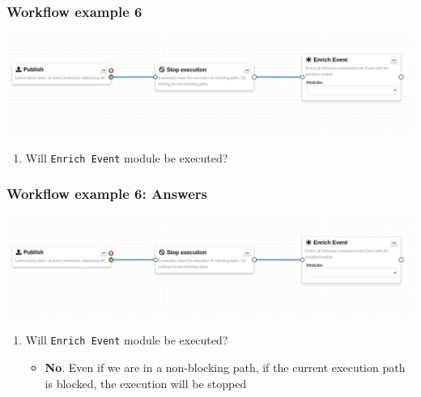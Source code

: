 \begin{frame}
    \frametitle{Workflow example 6}
    \begin{center}
        \includegraphics[width=0.9\linewidth]{pictures/example-6.png}
    \end{center}
    \begin{enumerate}
        \item Will \texttt{Enrich Event} module be executed?
    \end{enumerate}
\end{frame}
\begin{frame}
    \frametitle{Workflow example 6: Answers}
    \begin{center}
        \includegraphics[width=0.9\linewidth]{pictures/example-6.png}
    \end{center}
    \begin{enumerate}
        \item Will \texttt{Enrich Event} module be executed?
        \begin{itemize}
            \item \textbf{No}. Even if we are in a non-blocking path, if the current execution path is blocked, the execution will be stopped
        \end{itemize}
    \end{enumerate}
\end{frame}

